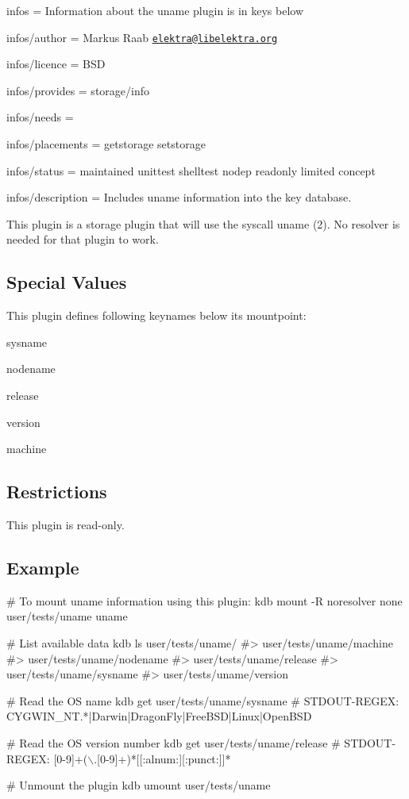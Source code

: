 
\begin{DoxyItemize}
\item infos = Information about the uname plugin is in keys below
\item infos/author = Markus Raab \href{mailto:elektra@libelektra.org}{\tt elektra@libelektra.\+org}
\item infos/licence = B\+SD
\item infos/provides = storage/info
\item infos/needs =
\item infos/placements = getstorage setstorage
\item infos/status = maintained unittest shelltest nodep readonly limited concept
\item infos/description = Includes uname information into the key database.
\end{DoxyItemize}

This plugin is a storage plugin that will use the syscall {\ttfamily uname (2)}. No resolver is needed for that plugin to work.

\subsection*{Special Values}

This plugin defines following keynames below its mountpoint\+:


\begin{DoxyItemize}
\item sysname
\item nodename
\item release
\item version
\item machine
\end{DoxyItemize}

\subsection*{Restrictions}

This plugin is read-\/only.

\subsection*{Example}


\begin{DoxyCode}
# To mount uname information using this plugin:
kdb mount -R noresolver none user/tests/uname uname

# List available data
kdb ls user/tests/uname/
#> user/tests/uname/machine
#> user/tests/uname/nodename
#> user/tests/uname/release
#> user/tests/uname/sysname
#> user/tests/uname/version

# Read the OS name
kdb get user/tests/uname/sysname
# STDOUT-REGEX: CYGWIN\_NT.*|Darwin|DragonFly|FreeBSD|Linux|OpenBSD

# Read the OS version number
kdb get user/tests/uname/release
# STDOUT-REGEX: [0-9]+(\(\backslash\).[0-9]+)*[[:alnum:][:punct:]]*

# Unmount the plugin
kdb umount user/tests/uname
\end{DoxyCode}
 